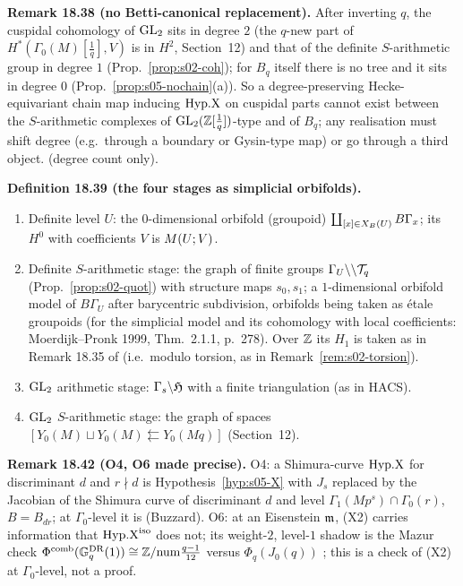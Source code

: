 \medskip
\noindent{}\label{rpt:rem:s05-degree}\textbf{Remark 18.38 (no Betti-canonical replacement).}
After inverting $q$, the cuspidal cohomology of $\mathrm{GL}_2$ sits in degree $2$ (the $q$-new part of $H^*(\Gamma_0(M)[\frac1q],V)$ is in $H^2$,
Section~12) and that of the definite $S$-arithmetic group in degree $1$ (Prop.~\ref{prop:s02-coh}); for $B_q$ itself there is no tree and
it sits in degree $0$ (Prop.~\ref{prop:s05-nochain}(a)). So a degree-preserving Hecke-equivariant chain map inducing $\mathrm{Hyp.X}$ on cuspidal
parts cannot exist between the $S$-arithmetic complexes of $\mathrm{GL}_2(\mathbb{Z}[\frac1q])$-type and of $B_q$; any realisation must shift degree
(e.g.\ through a boundary or Gysin-type map) or go through a third object. \stsketch{} (degree count only).

\medskip
\noindent{}\label{rpt:def:s05-stages}\textbf{Definition 18.39 (the four stages as simplicial orbifolds).}
\begin{enumerate}[label=(\roman*)]
\item Definite level $U$: the $0$-dimensional orbifold (groupoid) $\coprod_{[x]\in X_B(U)}B\Gamma_x$; its $H^0$ with coefficients $V$ is
  $M(U;V)$.
\item Definite $S$-arithmetic stage: the graph of finite groups $\Gamma_U\backslash\backslash\mathcal{T}_q$ (Prop.~\ref{prop:s02-quot}) with structure maps
  $s_0,s_1$; a $1$-dimensional orbifold model of $B\Gamma_U$ after barycentric subdivision, orbifolds being taken as étale groupoids
  \cite[\S4, Thm.~4.1, p.~11]{MP97} (for the simplicial model and its cohomology with local coefficients: Moerdijk--Pronk 1999, Thm.~2.1.1,
  p.~278). Over $\mathbb{Z}$ its $H_1$ is taken as in Remark 18.35 of \mainpdf{} (i.e.\ modulo torsion, as in Remark~\ref{rem:s02-torsion}).
\item $\mathrm{GL}_2$ arithmetic stage: $\Gamma_s\backslash\mathfrak{H}$ with a finite triangulation (as in HACS).
\item $\mathrm{GL}_2$ $S$-arithmetic stage: the graph of spaces $[Y_0(M)\sqcup Y_0(M)\leftleftarrows Y_0(Mq)]$ (Section~12).
\end{enumerate}

\medskip
\noindent{}\label{rpt:rem:s05-O46}\textbf{Remark 18.42 (O4, O6 made precise).}
O4: a Shimura-curve $\mathrm{Hyp.X}$ for discriminant $d$ and $r\nmid d$ is Hypothesis~\ref{hyp:s05-X} with $J_s$ replaced by the Jacobian of the
Shimura curve of discriminant $d$ and level $\Gamma_1(Mp^s)\cap\Gamma_0(r)$, $B=B_{dr}$; at $\Gamma_0$-level it is
\cite[Thm.~4.3, p.~11]{Koh01} (Buzzard). O6: at an Eisenstein $\mathfrak{m}$, (X2) carries information that $\mathrm{Hyp.X}^{\mathrm{iso}}$ does not; its weight-$2$,
level-$1$ shadow is the Mazur check $\Phi^{\mathrm{comb}}(\mathbb{G}^{\mathrm{DR}}_q(1))\cong\mathbb{Z}/\mathrm{num}\frac{q-1}{12}$ versus $\Phi_q(J_0(q))$
\cite[Appendix, Thm.~(A.1)(b), p.~173]{Mz}; this is a check of (X2) at $\Gamma_0$-level, not a proof.

